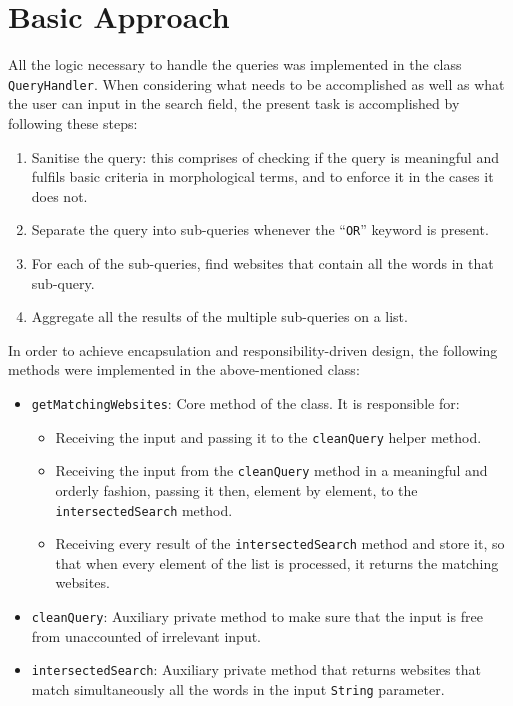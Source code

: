 \section{Basic Approach} %
All the logic necessary to handle the queries was implemented in the class {\tt QueryHandler}.
When considering what needs to be accomplished as well as what the user can input in the search field, the present task is accomplished by following these steps:
\begin{enumerate}
    \item Sanitise the query: this comprises of checking if the query is meaningful and fulfils basic criteria in morphological terms, and to enforce it in the cases it does not.
    \item Separate the query into sub-queries whenever the ``{\tt OR}'' keyword is present.
    \item For each of the sub-queries, find websites that contain all the words in that sub-query.
    \item Aggregate all the results of the multiple sub-queries on a list.
\end{enumerate}
In order to achieve encapsulation and responsibility-driven design, the following methods were implemented in the above-mentioned class:
\begin{itemize}
    \item {\tt getMatchingWebsites}: Core method of the class. It is responsible for:
    \begin{itemize}
        \item Receiving the input and passing it to the {\tt cleanQuery} helper method.
        \item Receiving the input from the {\tt cleanQuery} method in a meaningful and orderly fashion, passing it then, element by element, to the {\tt intersectedSearch} method.
        \item Receiving every result of the {\tt intersectedSearch} method and store it, so that when every element of the list is processed, it returns the matching websites.
    \end{itemize}
    \item {\tt cleanQuery}: Auxiliary private method to make sure that the input is free from unaccounted of irrelevant input.
    \item {\tt intersectedSearch}: Auxiliary private method that returns websites that match simultaneously all the words in the input {\tt String} parameter.
\end{itemize}

